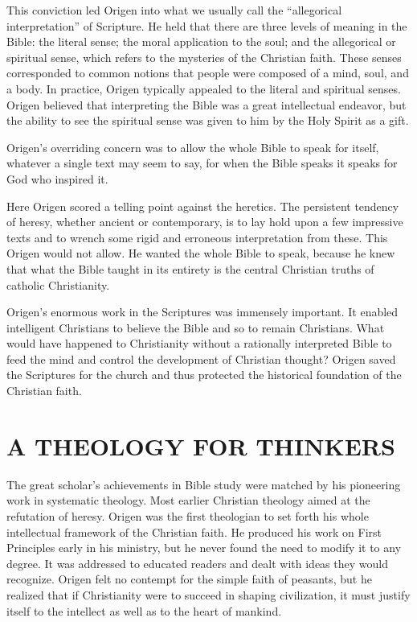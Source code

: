 This conviction led Origen into what we usually call the “allegorical interpretation” of Scripture.
He held that there are three levels of meaning in the Bible: the literal sense; the moral
application to the soul; and the allegorical or spiritual sense, which refers to the mysteries of
the Christian faith. These senses corresponded to common notions that people were composed of a
mind, soul, and a body. In practice, Origen typically appealed to the literal and spiritual senses.
Origen believed that interpreting the Bible was a great intellectual endeavor, but the ability to
see the spiritual sense was given to him by the Holy Spirit as a gift.

Origen’s overriding concern was to allow the whole Bible to speak for itself, whatever a single text
may seem to say, for when the Bible speaks it speaks for God who inspired it.

Here Origen scored a telling point against the heretics. The persistent tendency of heresy, whether
ancient or contemporary, is to lay hold upon a few impressive texts and to wrench some rigid and
erroneous interpretation from these. This Origen would not allow. He wanted the whole Bible to
speak, because he knew that what the Bible taught in its entirety is the central Christian truths of
catholic Christianity.

Origen’s enormous work in the Scriptures was immensely important. It enabled intelligent Christians
to believe the Bible and so to remain Christians. What would have happened to Christianity without a
rationally interpreted Bible to feed the mind and control the development of Christian thought?
Origen saved the Scriptures for the church and thus protected the historical foundation of the
Christian faith.

\section{A THEOLOGY FOR THINKERS}

The great scholar’s achievements in Bible study were matched by his pioneering work in systematic
theology. Most earlier Christian theology aimed at the refutation of heresy. Origen was the first
theologian to set forth his whole intellectual framework of the Christian faith. He produced his
work on First Principles early in his ministry, but he never found the need to modify it to any
degree. It was addressed to educated readers and dealt with ideas they would recognize. Origen felt
no contempt for the simple faith of peasants, but he realized that if Christianity were to succeed
in shaping civilization, it must justify itself to the intellect as well as to the heart of mankind.

